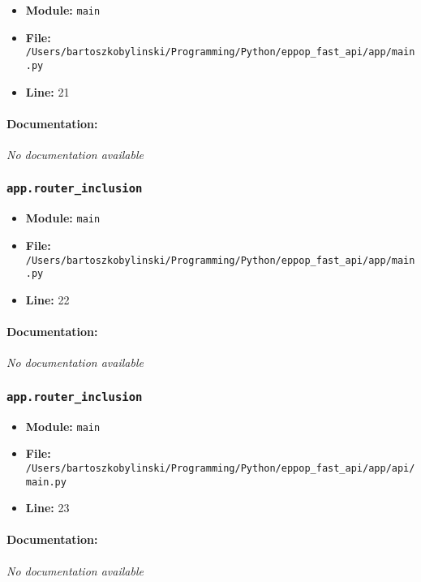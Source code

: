 \documentclass[11pt,a4paper]{article}
\begin{document}
\begin{itemize}
    \item \textbf{Module:} \texttt{main}
    \item \textbf{File:} \texttt{/Users/bartoszkobylinski/Programming/Python/eppop\_fast\_api/app/main.py}
    \item \textbf{Line:} 21
\end{itemize}

\paragraph{Documentation:} \textit{No documentation available}


\vspace{1em}
\subsubsection{\texttt{app.router\_inclusion}}

\begin{itemize}
    \item \textbf{Module:} \texttt{main}
    \item \textbf{File:} \texttt{/Users/bartoszkobylinski/Programming/Python/eppop\_fast\_api/app/main.py}
    \item \textbf{Line:} 22
\end{itemize}

\paragraph{Documentation:} \textit{No documentation available}


\vspace{1em}
\subsubsection{\texttt{app.router\_inclusion}}

\begin{itemize}
    \item \textbf{Module:} \texttt{main}
    \item \textbf{File:} \texttt{/Users/bartoszkobylinski/Programming/Python/eppop\_fast\_api/app/api/main.py}
    \item \textbf{Line:} 23
\end{itemize}

\paragraph{Documentation:} \textit{No documentation available}
\end{document}
